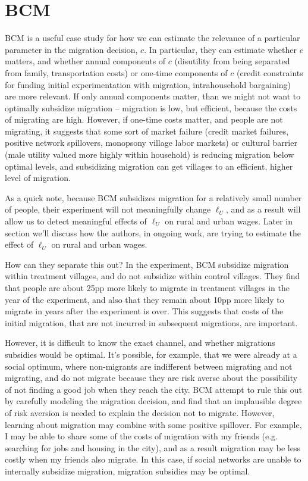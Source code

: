 \documentclass[12pt,english]{article}
\begin{document}
\section{BCM}

BCM is a useful case study for how we can estimate the relevance of a particular parameter in the migration decision, $c$. In particular, they can estimate whether $c$ matters, and whether annual components of $c$ (disutility from being separated from family, transportation costs) or one-time components of $c$ (credit constraints for funding initial experimentation with migration, intrahousehold bargaining) are more relevant. If only annual components matter, than we might not want to optimally subsidize migration -- migration is low, but efficient, because the costs of migrating are high. However, if one-time costs matter, and people are not migrating, it suggests that some sort of market failure (credit market failures, positive network spillovers, monopsony village labor markets) or cultural barrier (male utility valued more highly within household) is reducing migration below optimal levels, and subsidizing migration can get villages to an efficient, higher level of migration.

As a quick note, because BCM subsidizes migration for a relatively small number of people, their experiment will not meaningfully change $\ell_{U}$, and as a result will allow us to detect meaningful effects of $\ell_{U}$ on rural and urban wages. Later in section we'll discuss how the authors, in ongoing work, are trying to estimate the effect of $\ell_{U}$ on rural and urban wages.

How can they separate this out? In the experiment, BCM subsidize migration within treatment villages, and do not subsidize within control villages. They find that people are about 25pp more likely to migrate in treatment villages in the year of the experiment, and also that they remain about 10pp more likely to migrate in years after the experiment is over. This suggests that costs of the initial migration, that are not incurred in subsequent migrations, are important.

However, it is difficult to know the exact channel, and whether migrations subsidies would be optimal. It's possible, for example, that we were already at a social optimum, where non-migrants are indifferent between migrating and not migrating, and do not migrate because they are risk averse about the possibility of not finding a good job when they reach the city. BCM attempt to rule this out by carefully modeling the migration decision, and find that an implausible degree of risk aversion is needed to explain the decision not to migrate. However, learning about migration may combine with some positive spillover. For example, I may be able to share some of the costs of migration with my friends (e.g. searching for jobs and housing in the city), and as a result migration may be less costly when my friends also migrate. In this case, if social networks are unable to internally subsidize migration, migration subsidies may be optimal.
\end{document}
